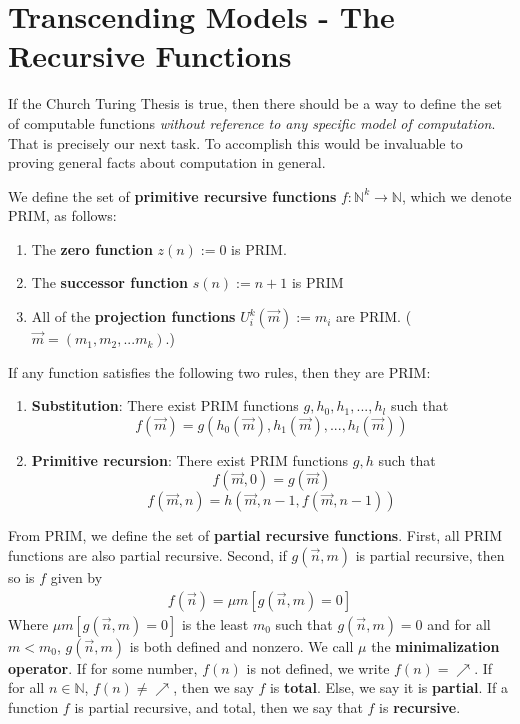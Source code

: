 \section{Transcending Models - The Recursive Functions}
\par If the Church Turing Thesis is true, then there should be a way to define the set of computable functions \textit{without reference to any specific model of computation}. That is precisely our next task. To accomplish this would be invaluable to proving general facts about computation in general.  
\begin{definition}
    We define the set of \textbf{primitive recursive functions} $f:\mathbb{N}^k \to \mathbb{N}$, which we denote PRIM, as follows:
    \begin{enumerate}
        \item The \textbf{zero function} $z(n):=0$ is PRIM.
        \item The \textbf{successor function} $s(n):=n+1$ is PRIM
        \item All of the \textbf{projection functions} $U_i^k(\vec{m}) := m_i$ are PRIM. ($\vec{m} = (m_1,m_2,...m_k)$.)
    \end{enumerate}
    If any function satisfies the following two rules, then they are PRIM:
    \begin{enumerate}
        \item \textbf{Substitution}: There exist PRIM functions $g,h_0,h_1,...,h_l$ such that 
            \[f(\vec{m})=g(h_0(\vec{m}),h_1(\vec{m}),...,h_l(\vec{m})) \]
        \item \textbf{Primitive recursion}: There exist PRIM functions $g,h$ such that
            \[f(\vec{m},0)=g(\vec{m})\]
            \[f(\vec{m},n)=h(\vec{m},n-1,f(\vec{m},n-1)) \]
    \end{enumerate}
    From PRIM, we define the set of \textbf{partial recursive functions}. First, all PRIM functions are also partial recursive. Second, if $g(\vec{n},m)$ is partial recursive, then so is $f$ given by
    \begin{align}
        f(\vec{n}) = \mu m[g(\vec{n},m)=0]
    \end{align}
    Where $\mu m[g(\vec{n},m)=0]$ is the least $m_0$ such that $g(\vec{n},m)=0$ and for all $m < m_0$, $g(\vec{n},m)$ is both defined and nonzero. We call $\mu$ the \textbf{minimalization operator}. If for some number, $f(n)$ is not defined, we write $f(n) = \nearrow$. If for all $n \in \mathbb{N}$, $f(n) \neq \nearrow$, then we say $f$ is \textbf{total}. Else, we say it is \textbf{partial}. If a function $f$ is partial recursive, and total, then we say that $f$ is \textbf{recursive}.  
\end{definition}
